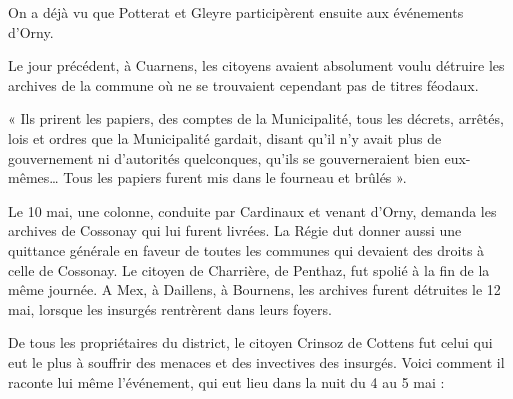 \documentclass[french,twoside]{book} %
\newenvironment{quoteblock}%
  {\begin{quoting}}
  {\end{quoting}}
\newenvironment{quotebar}{%
    \def\FrameCommand{{\color{rubric!10!}\vrule width 0.5em} \hspace{0.9em}}%
    \def\OuterFrameSep{\itemsep} %
    \MakeFramed {\advance\hsize-\width \FrameRestore}
  }%
  {%
    \endMakeFramed
  }
\renewenvironment{quoteblock}%
  {%
    \savenotes
    \setstretch{0.9}
    \begin{quotebar}
  }
  {%
    \end{quotebar}
    \spewnotes
  }
\begin{document}
\noindent On a déjà vu que Potterat et Gleyre participèrent ensuite aux événements d’Orny.\par
Le jour précédent, à Cuarnens, les citoyens avaient absolument voulu détruire les archives de la commune où ne se trouvaient cependant pas de titres féodaux.\par

\begin{quoteblock}
 \noindent « Ils prirent les papiers, des comptes de la Municipalité, tous les décrets, arrêtés, lois et ordres que la Municipalité gardait, disant qu’il n’y avait plus de gouvernement ni d’autorités quelconques, qu’ils se gouverneraient bien eux-mêmes… Tous les papiers furent mis dans le fourneau et brûlés ».
 \end{quoteblock}

\noindent Le 10 mai, une colonne, conduite par Cardinaux et venant d’Orny, demanda les archives de Cossonay qui lui furent livrées. La Régie dut donner aussi une quittance générale en faveur de toutes les communes qui devaient des droits à celle de Cossonay. Le citoyen de Charrière, de Penthaz, fut spolié à la fin de la même journée. A Mex, à Daillens, à Bournens, les archives furent détruites le 12 mai, lorsque les insurgés rentrèrent dans leurs foyers.\par
De tous les propriétaires du district, le citoyen Crinsoz de Cottens fut celui qui eut le plus à souffrir des menaces et des invectives des insurgés. Voici comment il raconte lui même l’événement, qui eut lieu dans la nuit du 4 au 5 mai :\par
\end{document}
